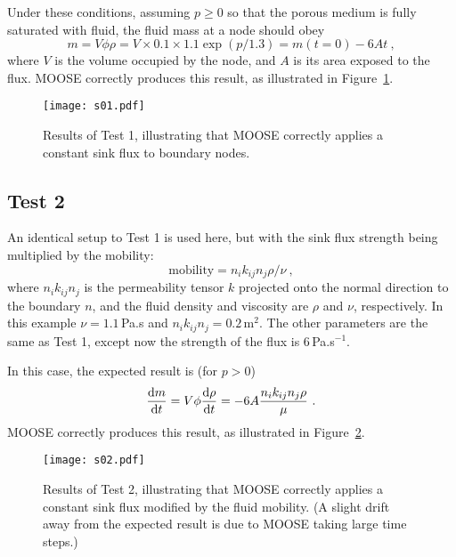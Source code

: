 Under these conditions, assuming $p\geq 0$ so that the porous medium
is fully saturated with fluid, the fluid mass at a node should obey
\begin{equation}
m = V\phi\rho = V\times0.1\times 1.1\exp(p/1.3) = m(t=0) - 6At \ ,
\end{equation}
where $V$ is the volume occupied by the node, and $A$ is its area
exposed to the flux.  MOOSE correctly produces this result, as
illustrated in Figure~\ref{s01.fig}.

\begin{figure}[htb]
\begin{center}
\texttt{[image: s01.pdf]}
\caption{Results of Test 1, illustrating that MOOSE correctly applies
  a constant sink flux to boundary nodes.}
\label{s01.fig}
\end{center}
\end{figure}

\subsection{Test 2}

An identical setup to Test 1 is used here, but with the sink flux
strength being multiplied by the mobility:
\begin{equation}
\mbox{mobility} = n_{i}k_{ij}n_{j}\rho/\nu \ ,
\end{equation}
where $n_{i}k_{ij}n_{j}$ is the permeability tensor $k$ projected onto
the normal direction to the boundary $n$, and the fluid density and
viscosity are $\rho$ and $\nu$, respectively.  In this example
$\nu=1.1$\,Pa.s and $n_{i}k_{ij}n_{j}=0.2$\,m$^{2}$.  The other
parameters are the same as Test 1, except now the strength of the flux
is 6\,Pa.s$^{-1}$.

In this case, the expected result is (for $p>0$)
\begin{equation}
\frac{\mathrm{d} m}{\mathrm{d} t} = V\phi \frac{\mathrm{d} \rho}{\mathrm{d} t} = -6 A
\frac{n_{i}k_{ij}n_{j}\rho}{\mu} \ .
\end{equation}
MOOSE correctly produces this result, as illustrated in
Figure~\ref{s02.fig}.

\begin{figure}[htb]
\begin{center}
\texttt{[image: s02.pdf]}
\caption{Results of Test 2, illustrating that MOOSE correctly applies
  a constant sink flux modified by the fluid mobility.  (A slight
  drift away from the expected result is due to MOOSE taking large
  time steps.)}
\label{s02.fig}
\end{center}
\end{figure}


